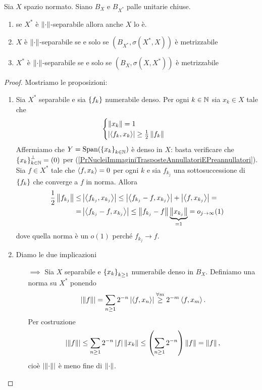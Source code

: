 \begin{theorem}\label{ThSeparabilitaInTerminiDiMetrizzabilitaDiPalle}
Sia $X$ spazio normato. Siano $B_X$ e $B_{X^\ast}$ palle unitarie chiuse.
\begin{enumerate}
	\item se $X^\ast$ \`e ${\left\Vert{\cdot}\right\Vert}$-separabile allora anche $X$ lo \`e.
	\item $X$ \`e ${\left\Vert{\cdot}\right\Vert}$-separabile se e solo se $(B_{X^\ast},\sigma(X^\ast,X))$ \`e metrizzabile
	\item $X^\ast$ \`e ${\left\Vert{\cdot}\right\Vert}$-separabile se e solo se $(B_X,\sigma(X,X^\ast))$ \`e metrizzabile
\end{enumerate}
\end{theorem}
\begin{proof}
Mostriamo le proposizioni:
\setlength{\leftmargini}{0cm}
\begin{enumerate}
	\item Sia $X^\ast$ separabile e sia $\left\{{f_k}\right\}$ numerabile denso. Per ogni $k\in\mathbb{N}$ sia $x_k\in X$ tale che
	\[\begin{cases}
		\left\Vert{x_k}\right\Vert=1\\
		\left|{\left\langle {f_k,x_k}\right\rangle}\right|\geq \frac12\left\Vert{f_k}\right\Vert
	\end{cases}\]
	Affermiamo che $Y=\operatorname{Span}(\left\{{x_k}\right\}_{k\in\mathbb{N}})$ \`e denso in $X$: basta verificare che $\left\{{x_k}\right\}_{k\in\mathbb{N}}^\perp=(0)$ per (\ref{PrNucleiImmaginiTrasposteAnnullatoriEPreannullatori}). Sia $f\in X^\ast$ tale che $\left\langle {f,x_k}\right\rangle=0$ per ogni $k$ e sia $f_{k_j}$ una sottosuccessione di $\left\{{f_k}\right\}$ che converge a $f$ in norma. Allora
	\begin{align*}
		\frac12\left\Vert{f_{k_j}}\right\Vert\leq& \left|{\left\langle {f_{k_j},x_{k_j}}\right\rangle}\right|\leq\left|{\left\langle {f_{k_j}-f,x_{k_j}}\right\rangle}\right|+\left|{\left\langle {f,x_{k_j}}\right\rangle}\right|=\\
		=&\left|{\left\langle {f_{k_j}-f,x_{k_j}}\right\rangle}\right|\leq \left\Vert{f_{k_j}-f}\right\Vert\underset{=1}{\underbrace{\left\Vert{x_{k_j}}\right\Vert}}=o_{j\to\infty}(1)
	\end{align*}
	dove quella norma \`e un $o(1)$ perch\'e $f_{k_j}\to f$.
	\item Diamo le due implicazioni
	\setlength{\leftmargini}{0cm}
	\begin{itemize}
	\item[$\boxed{\implies}$] Sia $X$ separabile e $\left\{{x_{k}}\right\}_{k\geq1}$ numerabile denso in $B_X$. Definiamo una norma su $X^\ast$ ponendo
	\[\left|{\left\Vert{f}\right\Vert}\right|=\sum_{n\geq 1}2^{-n}\left|{\left\langle {f,x_n}\right\rangle}\right|\overset{\forall m}\geq 2^{-m}\left\langle {f,x_m}\right\rangle.\]
	Per costruzione
	\[\left|{\left\Vert{f}\right\Vert}\right|\leq \sum_{n\geq 1}2^{-n}\left|{f}\right|\left\Vert{x_k}\right\Vert\leq \left({\sum_{n\geq 1}2^{-n}}\right)\left\Vert{f}\right\Vert=\left\Vert{f}\right\Vert,\]
	cio\`e $\left|{{\left\Vert{\cdot}\right\Vert}}\right|$ \`e meno fine di ${\left\Vert{\cdot}\right\Vert}$. 


\end{itemize}
\end{enumerate}
\end{proof}
